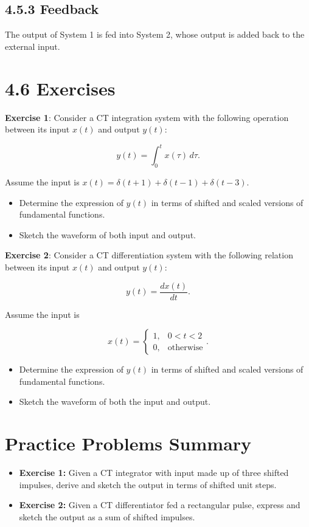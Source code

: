\documentclass[11pt]{article}
\begin{document}
\subsection*{4.5.3 Feedback}

The output of System 1 is fed into System 2, whose output is added back to the external input.

\section*{4.6 Exercises}

\textbf{Exercise 1}: Consider a CT integration system with the following operation between its input $x(t)$ and output $y(t)$:

\[y(t) = \int_0^t x(\tau)\, d\tau.\]

Assume the input is $x(t) = \delta(t+1) + \delta(t-1) + \delta(t-3)$.

\begin{itemize}
  \item Determine the expression of $y(t)$ in terms of shifted and scaled versions of fundamental functions.
  \item Sketch the waveform of both input and output.
\end{itemize}

\textbf{Exercise 2}: Consider a CT differentiation system with the following relation between its input $x(t)$ and output $y(t)$:

\[y(t) = \frac{dx(t)}{dt}.\]

Assume the input is

\[x(t) = \begin{cases} 1, & 0 < t < 2 \\ 0, & \text{otherwise} \end{cases}.\]

\begin{itemize}
  \item Determine the expression of $y(t)$ in terms of shifted and scaled versions of fundamental functions.
  \item Sketch the waveform of both the input and output.
\end{itemize}

\section*{Practice Problems Summary}

\begin{itemize}
  \item \textbf{Exercise 1:} Given a CT integrator with input made up of three shifted impulses, derive and sketch the output in terms of shifted unit steps.
  \item \textbf{Exercise 2:} Given a CT differentiator fed a rectangular pulse, express and sketch the output as a sum of shifted impulses.
\end{itemize}
\end{document}
